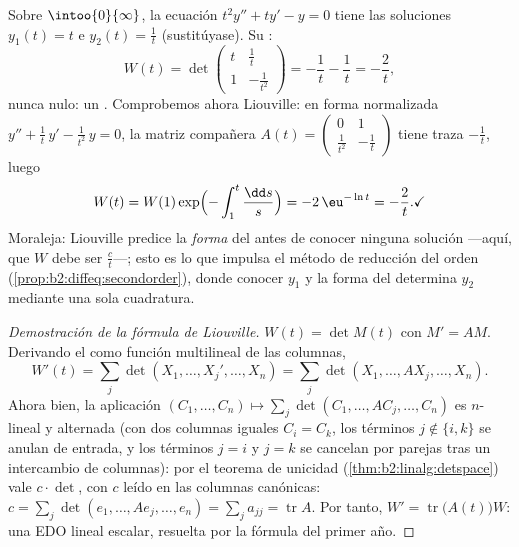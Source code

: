 \begin{example}\label{ex:b2:diffeq:eulerwronskian}
Sobre $\intoo{0}{\infty}$, la ecuación $t^2y'' + ty' - y = 0$ tiene
las soluciones $y_1(t) = t$ e $y_2(t) = \frac1t$ (sustitúyase). Su
:
\[
W(t) = \det\begin{pmatrix} t & \tfrac1t\\[2pt]
1 & -\tfrac{1}{t^2}\end{pmatrix}
= -\frac1t - \frac1t = -\frac2t ,
\]
nunca nulo: un . Comprobemos ahora Liouville: en
forma normalizada $y'' + \frac1t\,y' - \frac{1}{t^2}\,y = 0$, la
matriz compañera $A(t) = \begin{pmatrix} 0 & 1\\ \frac{1}{t^2} &
-\frac1t\end{pmatrix}$ tiene traza $-\frac1t$, luego
\[
W(t) = W(1)\exp\Bigl(-\int_1^t\frac{\dd s}{s}\Bigr)
= -2\,\eu^{-\ln t} = -\frac2t . \checkmark
\]
Moraleja: Liouville predice la \emph{forma} del  antes de
conocer ninguna solución ---aquí, que $W$ debe ser $\frac{c}{t}$---;
esto es lo que impulsa el método de reducción del orden
(\cref{prop:b2:diffeq:secondorder}), donde conocer $y_1$ y la forma
del  determina $y_2$ mediante una sola cuadratura.
\end{example}

\begin{proof}[Demostración de la fórmula de Liouville]
$W(t) = \det M(t)$ con $M' = AM$. Derivando el  como
función multilineal de las columnas,
\[
W'(t) = \sum_j \det(X_1, \dots, X_j', \dots, X_n)
= \sum_j \det(X_1, \dots, AX_j, \dots, X_n) .
\]
Ahora bien, la aplicación $(C_1, \dots, C_n) \mapsto \sum_j \det(C_1,
\dots, AC_j, \dots, C_n)$ es $n$-lineal y alternada (con dos columnas
iguales $C_i = C_k$, los términos $j \notin \{i, k\}$ se anulan de
entrada, y los términos $j = i$ y $j = k$ se cancelan por parejas tras
un intercambio de columnas): por el teorema de unicidad
(\cref{thm:b2:linalg:detspace}) vale $c \cdot \det$, con $c$ leído en
las columnas canónicas: $c = \sum_j \det(e_1, \dots, Ae_j, \dots,
e_n) = \sum_j a_{jj} = \operatorname{tr} A$. Por tanto, $W' =
\operatorname{tr}\bigl(A(t)\bigr)W$: una EDO lineal escalar, resuelta
por la fórmula del primer año.
\end{proof}

